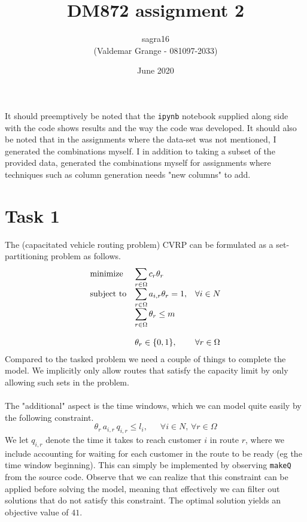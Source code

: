 \documentclass{article}
\title{DM872 assignment 2}
\author{sagra16 \\(Valdemar Grange - 081097-2033) }
\date{June 2020}
\begin{document}
    \maketitle
    It should preemptively be noted that the \texttt{ipynb} notebook supplied along side with the code shows results and the way the code was developed.
    It should also be noted that in the assignments where the data-set was not mentioned, I generated the combinations myself.
    I in addition to taking a subset of the provided data, generated the combinations myself for assignments where techniques such as column generation needs "new columns" to add.
    
    \clearpage

    \section{Task 1}
    The (capacitated vehicle routing problem) CVRP can be formulated as a set-partitioning problem as follows.
    \begin{equation*}
        \begin{array}{ll@{}ll}
            \text{minimize}  & \displaystyle\sum_{r \in \Omega} c_r \theta_r& &\\
            \text{subject to}& \displaystyle\sum_{r \in \Omega} a_{i, r} \theta_r = 1 ,&   &\forall i \in N\\
                             & \displaystyle\sum_{r \in \Omega} \theta_r \leq m &&\\\\
                             & \displaystyle \theta_r  \in \{0,1\},  && \forall r \in \Omega
        \end{array}
    \end{equation*}
    Compared to the tasked problem we need a couple of things to complete the model.
    We implicitly only allow routes that satisfy the capacity limit by only allowing such sets in the problem.\\\\
    The "additional" aspect is the time windows, which we can model quite easily by the following constraint.
    \[
    \theta_r \, a_{i,r} \, q_{i,r} \leq l_i   , \,\,\,\,\,\,\,\,\, \forall i \in N, \, \forall r \in \Omega
    \]
    We let $q_{i,r}$ denote the time it takes to reach customer $i$ in route $r$, where we include accounting for waiting for each customer in the route to be ready (eg the time window beginning).
    This can simply be implemented by observing \texttt{makeQ} from the source code.
    Observe that we can realize that this constraint can be applied before solving the model, meaning that effectively we can filter out solutions that do not satisfy this constraint.
    The optimal solution yields an objective value of $41$.
\end{document}
